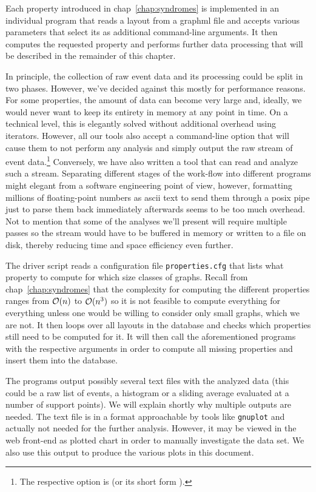 \documentclass{graphstudy}
\begin{document}
Each property introduced in \acl{chap}~\ref{chap:syndromes} is implemented in an individual program that reads a layout
from a \ac{graphml} file and accepts various parameters that select its  as additional
command-line arguments.  It then computes the requested property and performs further data processing that will be
described in the remainder of this chapter.

In principle, the collection of raw event data and its processing could be split in two phases.  However, we've decided
against this mostly for performance reasons.  For some properties, the amount of data can become very large and,
ideally, we would never want to keep its entirety in memory at any point in time.  On a technical level, this is
elegantly solved without additional overhead using {\CXX} iterators.  However, all our tools also accept a command-line
option that will cause them to not perform any analysis and simply output the raw stream of event data.\footnote{%
  The respective option is  (or its short form ).
}
Conversely, we have also written a tool that can read and analyze such a stream.  Separating different stages of the
work-flow into different programs might elegant from a software engineering point of view, however, formatting millions
of floating-point numbers as \acs{ascii} text to send them through a \acs{posix} pipe just to parse them back
immediately afterwards seems to be too much overhead.  Not to mention that some of the analyses we'll present will
require multiple passes so the stream would have to be buffered in memory or written to a file on disk, thereby reducing
time and space efficiency even further.

The driver script reads a configuration file \verb`properties.cfg` that lists what property to compute for which size
classes of graphs.  Recall from \acl{chap}~\ref{chap:syndromes} that the complexity for computing the different
properties ranges from \(\operatorname{\mathcal{O}}(n)\) to \(\operatorname{\mathcal{O}}(n^3)\) so it is not feasible to compute everything for everything unless
one would be willing to consider only small graphs, which we are not.  It then loops over all layouts in the database
and checks which properties still need to be computed for it.  It will then call the aforementioned programs with the
respective arguments in order to compute all missing properties and insert them into the database.

The programs output possibly several text files with the analyzed data (this could be a raw list of events, a histogram
or a sliding average evaluated at a number of support points).  We will explain shortly why multiple outputs are needed.
The text file is in a format approachable by tools like \verb`gnuplot` and actually not needed for the further analysis.
However, it may be viewed in the web front-end as plotted chart in order to manually investigate the data set.  We also
use this output to produce the various plots in this document.
\end{document}
